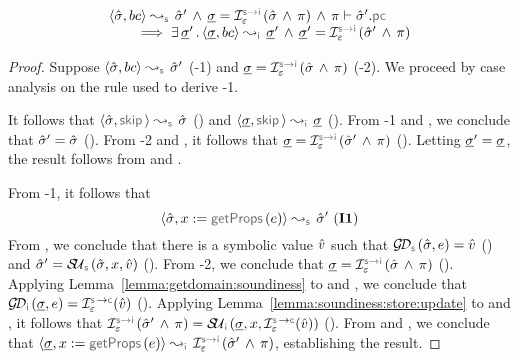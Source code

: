 \begin{lemma}\label{lemma:soundiness:basic:commands}
$$
\begin{array}{l}
\absbsemrule{\sstate, \bcmd}{\sstate'}{\symbolic} 
    \, \wedge \, \istate = \interpret{\symbinst}{\senv}(\sstate \, \wedge \, \pc)
    \, \wedge \, {\pc \vdash \sstate'.\pcsel} \\ \quad \quad
     \implies 
        \exists \, \istate' \, . \, \absbsemrule{\istate, \bcmd}{\istate'}{\instrumented} \, \wedge \, 
            \istate' = \interpret{\symbinst}{\senv}(\sstate' \, \wedge \, \pc)  
\end{array}
$$
\end{lemma}
\begin{proof}
{Suppose $\absbsemrule{\sstate, \bcmd}{\sstate'}{\symbolic}$ (\hyp{1}) and 
$\istate = \interpret{\symbinst}{\senv}(\sstate \, \wedge \, \pc)$ (\hyp{2}).}
We proceed by case analysis on the rule used to derive \hyp{1}. 
\vspace{3pt}

\noindent {} It follows that $\absbsemrule{\sstate, \jsilskip}{\sstate}{\symbolic}$ () and 
$\absbsemrule{\istate, \jsilskip}{\istate}{\instrumented}$ (). 
From \hyp{1} and , we conclude that $\hat{\sigma}' = \hat{\sigma}$ (). 
From \hyp{2} and , it follows that $\istate = \interpret{\symbinst}{\senv}(\sstate' \, \wedge \, \pc)$ (). 
Letting $\underline{\sigma}' = \underline{\sigma}$, the result follows from  and . 
\vspace{5pt}

\noindent {} From \hyp{1}, it follows that 
$$
\absbsemrule{\sstate, \jvar := \getfields(\jsilexpr)}{\sstate'}{\symbolic} \text{ (\ieq{1})}
$$ 
From , we conclude that there is a symbolic value $\hat{v}$ such that 
$\absgetdomainfun{\symbolic}(\sstate, \jsilexpr) = \sexprv$ () 
and $\sstate' = \stupdt{\symbolic}(\sstate, \jvar, \sexprv)$ ().  
From \hyp{2}, we conclude that $\istate = \interpret{\symbinst}{\senv}(\sstate \, \wedge \, \pc)$ (). 
Applying Lemma~\ref{lemma:getdomain:soundiness} to  and , we conclude that 
$\absgetdomainfun{\instrumented}(\istate, \jsilexpr) = \interpret{\symbconc}{\senv}(\sexprv)$ (). 
Applying Lemma~\ref{lemma:soundiness:store:update} to  and , it follows that 
$ \interpret{\symbinst}{\senv}(\sstate' \, \wedge \, \pc) = \stupdt{\instrumented}(\istate, \jvar, \interpret{\symbconc}{\senv}(\sexprv))$ (). 
From  and , we conclude that $\absbsemrule{\istate, \jvar := \getfields(\jsilexpr)}{\interpret{\symbinst}{\senv}(\sstate' \, \wedge \, \pc)}{\instrumented}$, establishing the result. 
\vspace{5pt}


\end{proof}
